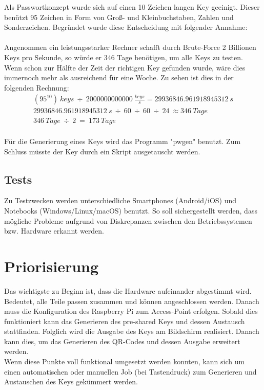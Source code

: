 \documentclass[a4paper,11pt,singlespacing]{article}
\begin{document}
			Als Passwortkonzept wurde sich auf einen 10 Zeichen langen Key geeinigt. Dieser benützt 95 Zeichen in Form von Groß- und Kleinbuchstaben, Zahlen und Sonderzeichen. Begründet wurde diese Entscheidung mit folgender Annahme: \\\\
		Angenommen ein leistungsstarker Rechner schafft durch Brute-Force 2 Billionen Keys pro Sekunde, so würde er 346 Tage benötigen, um alle Keys zu testen.  Wenn schon zur Hälfte der Zeit der richtigen Key gefunden wurde, wäre dies immernoch mehr als ausreichend für eine Woche. Zu sehen ist dies in der folgenden Rechnung:
		\begin{eqnarray}
			(95^{10})\ keys\ \div\ 2000000000000\ \frac{keys}{s} =  29936846.961918945312\ s\\
			29936846.961918945312\ s\ \div\ 60\ \div\ 60\ \div\ 24\ \approx 346 \ Tage\\
			346\ Tage\ \div\ 2\ =\ 173\ Tage
		\end{eqnarray}\\
	    Für die Generierung eines Keys wird das Programm "pwgen" benutzt.
		Zum Schluss müsste der Key durch ein Skript ausgetauscht werden.\\
	
		\subsection{Tests}
		Zu Testzwecken werden unterschiedliche Smartphones (Android/iOS) und Notebooks (Windows/Linux/macOS) benutzt. So soll sichergestellt werden, dass mögliche Probleme aufgrund von Diskrepanzen zwischen den Betriebssystemen bzw. Hardware erkannt werden.
	
	\section{Priorisierung}
	
	Das wichtigste zu Beginn ist, dass die Hardware aufeinander abgestimmt wird. Bedeutet, alle Teile passen zusammen und können angeschlossen werden.
	Danach muss die Konfiguration des Raspberry Pi zum Access-Point erfolgen. Sobald dies funktioniert kann das Generieren des pre-shared Keys und dessen Austausch stattfinden. Folglich wird die Ausgabe des Keys am Bildschirm realisiert. Danach kann dies, um das Generieren des QR-Codes und dessen Ausgabe erweitert werden.\\
	Wenn diese Punkte voll funktional umgesetzt werden konnten, kann sich um einen automatischen oder manuellen Job (bei Tastendruck) zum Generieren und Austauschen des Keys gekümmert werden.
		
\end{document}
